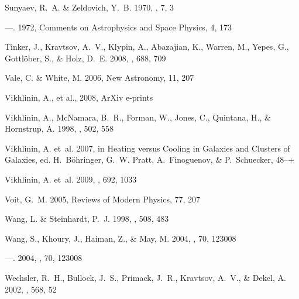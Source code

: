 \documentclass[12pt]{emulateapj}
\begin{document}
\begin{thebibliography}{111}
{Sunyaev}, R.~A. \& {Zeldovich}, Y.~B. 1970, \apss, 7, 3

---. 1972, Comments on Astrophysics and Space Physics, 4, 173

{Tinker}, J., {Kravtsov}, A.~V., {Klypin}, A., {Abazajian}, K., {Warren}, M.,
  {Yepes}, G., {Gottl{\"o}ber}, S., \& {Holz}, D.~E. 2008, \apj, 688, 709

{Vale}, C. \& {White}, M. 2006, New Astronomy, 11, 207

{Vikhlinin}, A., et al., 2008, ArXiv e-prints

{Vikhlinin}, A., {McNamara}, B.~R., {Forman}, W., {Jones}, C., {Quintana}, H.,
  \& {Hornstrup}, A. 1998, \apj, 502, 558

{Vikhlinin}, A. {et~al.} 2007, in Heating versus Cooling in Galaxies and
  Clusters of Galaxies, ed. H.~{B{\"o}hringer}, G.~W. {Pratt}, A.~{Finoguenov},
  \& P.~{Schuecker}, 48--+

{Vikhlinin}, A. {et~al.} 2009, \apj, 692, 1033

{Voit}, G.~M. 2005, Reviews of Modern Physics, 77, 207

{Wang}, L. \& {Steinhardt}, P.~J. 1998, \apj, 508, 483

{Wang}, S., {Khoury}, J., {Haiman}, Z., \& {May}, M. 2004{}, \prd,
  70, 123008

---. 2004{}, \prd, 70, 123008

{Wechsler}, R.~H., {Bullock}, J.~S., {Primack}, J.~R., {Kravtsov}, A.~V., \&
  {Dekel}, A. 2002, \apj, 568, 52


\end{thebibliography}
\end{document}
